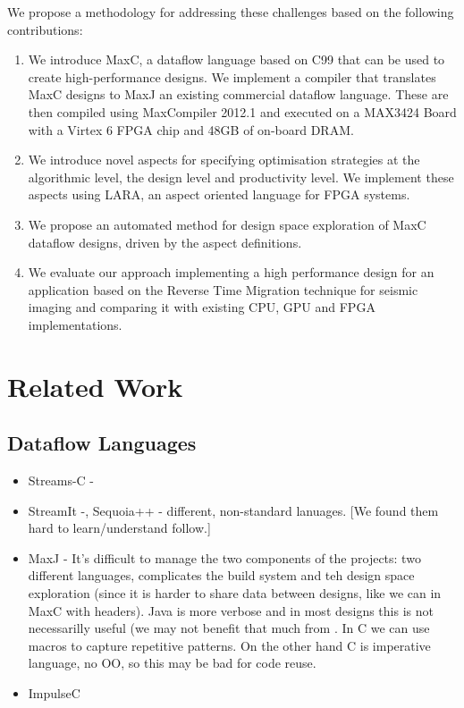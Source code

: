 We propose a methodology for addressing these challenges based on the
following contributions:
\begin{enumerate}
\item We introduce MaxC, a dataflow language based on C99 that can be
  used to create high-performance designs. We implement a compiler
  that translates MaxC designs to MaxJ an existing commercial dataflow
  language. These are then compiled using MaxCompiler 2012.1 and
  executed on a MAX3424 Board with a Virtex 6 FPGA chip and 48GB of
  on-board DRAM.
\item We introduce novel aspects for specifying optimisation
  strategies at the algorithmic level, the design level and
  productivity level. We implement these aspects using
  LARA, an aspect oriented language for FPGA systems.
\item We propose an automated method for design space exploration of
  MaxC dataflow designs, driven by the aspect definitions.
\item We evaluate our approach implementing a high performance design
  for an application based on the Reverse Time Migration technique for
  seismic imaging and comparing it with existing CPU, GPU and FPGA
  implementations.
\end{enumerate}

\section{Related Work}

\subsection{Dataflow Languages}
\begin{itemize}

\item Streams-C -

\item StreamIt -, Sequoia++ - different, non-standard lanuages. [We
  found them hard to learn/understand follow.]

\item MaxJ - It’s difficult to manage the two components of the
  projects: two different languages, complicates the build system and
  teh design space exploration (since it is harder to share data
  between designs, like we can in MaxC with headers). Java is more
  verbose and in most designs this is not necessarilly useful (we may
  not benefit that much from . In C we can use macros to capture
  repetitive patterns. On the other hand C is imperative language, no
  OO, so this may be bad for code reuse.

\item ImpulseC

\end{itemize}

